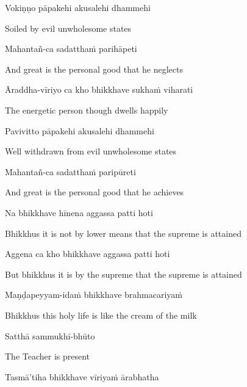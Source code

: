 Vokiṇṇo pāpakehi akusalehi dhammehi

\begin{cprenglish}
Soiled by evil unwholesome states
\end{cprenglish}

Mahantañ-ca sadatthaṁ parihāpeti

\begin{cprenglish}
And great is the personal good that he neglects
\end{cprenglish}

Āraddha-vīriyo ca kho bhikkhave sukhaṁ viharati

\begin{cprenglish}
The energetic person though dwells happily
\end{cprenglish}

Pavivitto pāpakehi akusalehi dhammehi

\begin{cprenglish}
Well withdrawn from evil unwholesome states
\end{cprenglish}

Mahantañ-ca sadatthaṁ paripūreti

\begin{cprenglish}
And great is the personal good that he achieves
\end{cprenglish}

Na bhikkhave hīnena aggassa patti hoti

\begin{cprenglish}
Bhikkhus it is not by lower means that the supreme is attained
\end{cprenglish}

Aggena ca kho bhikkhave aggassa patti hoti

\begin{cprenglish}
But bhikkhus it is by the supreme that the supreme is attained
\end{cprenglish}

Maṇḍapeyyam-idaṁ bhikkhave brahmacariyaṁ

\begin{cprenglish}
Bhikkhus this holy life is like the cream of the milk
\end{cprenglish}

Satthā sammukhī-bhūto

\begin{cprenglish}
The Teacher is present
\end{cprenglish}

Tasmā’tiha bhikkhave vīriyaṁ ārabhatha


